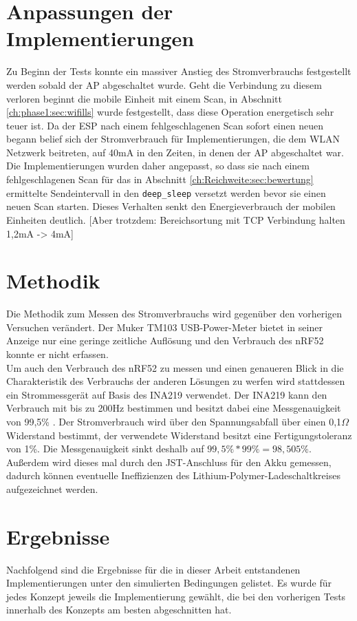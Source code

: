 \section{Anpassungen der Implementierungen}
Zu Beginn der Tests konnte ein massiver Anstieg des Stromverbrauchs festgestellt werden sobald der AP abgeschaltet wurde.
Geht die Verbindung zu diesem verloren beginnt die mobile Einheit mit einem Scan, in Abschnitt \ref{ch:phase1:sec:wifills} wurde festgestellt, dass diese Operation energetisch sehr teuer ist.
Da der ESP nach einem fehlgeschlagenen Scan sofort einen neuen begann belief sich der Stromverbrauch für Implementierungen, die dem WLAN Netzwerk beitreten, auf 40mA in den Zeiten, in denen der AP abgeschaltet war.
Die Implementierungen wurden daher angepasst, so dass sie nach einem fehlgeschlagenen Scan für das in Abschnitt \ref{ch:Reichweite:sec:bewertung} ermittelte Sendeintervall in den \texttt{deep\_sleep} versetzt werden bevor sie einen neuen Scan starten.
Dieses Verhalten senkt den Energieverbrauch der mobilen Einheiten deutlich.
[Aber trotzdem: Bereichsortung mit TCP Verbindung halten 1,2mA -> 4mA]

\section{Methodik}
Die Methodik zum Messen des Stromverbrauchs wird gegenüber den vorherigen Versuchen verändert.
Der Muker TM103 USB-Power-Meter bietet in seiner Anzeige nur eine geringe zeitliche Auflösung und den Verbrauch des nRF52 konnte er nicht erfassen.\\
Um auch den Verbrauch des nRF52 zu messen und einen genaueren Blick in die Charakteristik des Verbrauchs der anderen Lösungen zu werfen wird stattdessen ein Strommessgerät auf Basis des INA219 verwendet.
Der INA219 kann den Verbrauch mit bis zu 200Hz bestimmen und besitzt dabei eine Messgenauigkeit von 99,5\% \cite{texas2015ina}.
Der Stromverbrauch wird über den Spannungsabfall über einen 0,1$\Omega$ Widerstand bestimmt, der verwendete Widerstand besitzt eine Fertigungstoleranz von 1\%.
Die Messgenauigkeit sinkt deshalb auf $99,5\% * 99\% = 98,505\%$. \\
Außerdem wird dieses mal durch den JST-Anschluss für den Akku gemessen, dadurch können eventuelle Ineffizienzen des Lithium-Polymer-Ladeschaltkreises aufgezeichnet werden. 

\section{Ergebnisse}
Nachfolgend sind die Ergebnisse für die in dieser Arbeit entstandenen Implementierungen unter den simulierten Bedingungen gelistet.
Es wurde für jedes Konzept jeweils die Implementierung gewählt, die bei den vorherigen Tests innerhalb des Konzepts am besten abgeschnitten hat.\\


